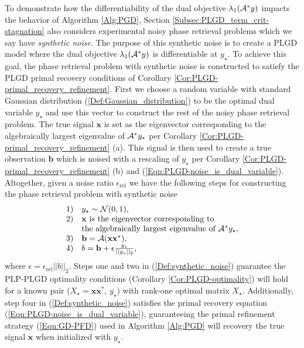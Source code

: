 To demonstrate how the differentiability of the dual objective $\lambda_1({\mathcal A}^*y)$ impacts the behavior of Algorithm \ref{Alg:PGD}, Section \ref{Subsec:PLGD_term_crit-stagnation} also considers experimental noisy phase retrieval problems which we say have \textit{synthetic noise}.
The purpose of this synthetic noise is to create a PLGD model where the dual objective $\lambda_1({\mathcal A}^*y)$ is differentiable at $y_\star$.  
To achieve this goal, the phase retrieval problem with synthetic noise is constructed to satisfy the PLGD primal recovery conditions of Corollary \ref{Cor:PLGD-primal_recovery_refinement}.  First we choose a random variable with standard Gaussian distribution (\ref{Def:Gaussian_distribution}) to be the optimal dual variable $y_\star$ and use this vector to construct the rest of the noisy phase retrieval problem.  The true signal $\mathbf{x}$ is set as the eigenvector corresponding to the algebraically largest eigenvalue of ${\mathcal A}^*y_\star$ per Corollary \ref{Cor:PLGD-primal_recovery_refinement} (a).  This signal is then used to create a true observation $\mathbf{b}$ which is noised with a rescaling of $y_\star$ per Corollary \ref{Cor:PLGD-primal_recovery_refinement} (b) and  (\ref{Eqn:PLGD-noise_is_dual_variable}).  Altogether, given a noise ratio $\epsilon_\text{rel}$ we have the following steps for constructing the phase retrieval problem with synthetic noise
\begin{equation} 			\label{Def:synthetic_noise}
\begin{array}{ll}
1)	&	y_\star \sim {\mathcal N}(0,1), 	\\
2) & \mathbf{x} \text{ is the eigenvector corresponding to } \\
	&	\text{the algebraically largest eigenvalue of } {\mathcal A}^*y_\star, \\
3) & \mathbf{b} = {\mathcal A}(\mathbf{x}\mathbf{x}^*), \\
4) & b = \mathbf{b} + \epsilon \frac{y_\star}{|| y_\star ||_2},
\end{array}
\end{equation}
where $\epsilon = \epsilon_\text{rel}||b||_2$.  
Steps one and two in (\ref{Def:synthetic_noise}) guarantee the PLP-PLGD optimality conditions (Corollary \ref{Cor:PLGD-optimality}) will hold for a known pair ($X_\star = \mathbf{x}\mathbf{x}^*$, $y_\star$) with rank-one optimal matrix $X_\star$.  
Additionally, step four in (\ref{Def:synthetic_noise}) satisfies the primal recovery equation (\ref{Eqn:PLGD-noise_is_dual_variable}), guaranteeing the primal refinement strategy (\ref{Eqn:GD-PFD}) used in Algorithm \ref{Alg:PGD} will recovery the true signal $\mathbf{x}$ when initialized with $y_\star$.
